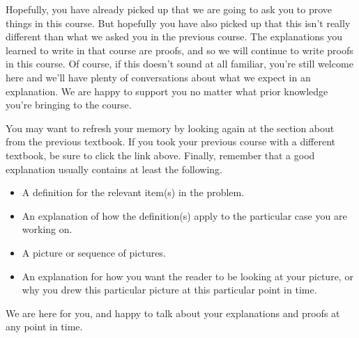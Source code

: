 \documentclass{ximera}
\begin{document}
Hopefully, you have already picked up that we are going to ask you to prove things in this course. But hopefully you have also picked up that this isn't really different than what we asked you in the previous course. The explanations you learned to write in that course are proofs, and so we will continue to write proofs in this course. Of course, if this doesn't sound at all familiar, you're still welcome here and we'll have plenty of conversations about what we expect in an explanation. We are happy to support you no matter what prior knowledge you're bringing to the course.

You may want to refresh your memory by looking again at the section about  from the previous textbook. If you took your previous course with a different textbook, be sure to click the link above. Finally, remember that a good explanation usually contains at least the following.

\begin{itemize}
	\item A definition for the relevant item(s) in the problem.
	\item An explanation of how the definition(s) apply to the particular case you are working on.
	\item A picture or sequence of pictures.
	\item An explanation for how you want the reader to be looking at your picture, or why you drew this particular picture at this particular point in time.
\end{itemize}

We are here for you, and happy to talk about your explanations and proofs at any point in time.
\end{document}

